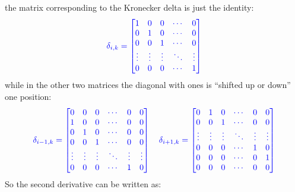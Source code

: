 \documentclass{article}
\begin{document}
\noindent
the matrix corresponding to the Kronecker delta is just the identity:
\begin{equation}
\textcolor{blue}{\delta_{i,k} =
\begin{bmatrix}
1 & 0 & 0 & \cdots & 0 \\
0 & 1 & 0 & \cdots & 0 \\
0 & 0 & 1 & \cdots & 0 \\
\vdots & \vdots & \vdots & \ddots & \vdots \\
0 & 0 & 0 & \cdots & 1
\end{bmatrix}}
\end{equation}
while in the other two matrices the diagonal with ones is ``shifted up or down'' one position:
\begin{equation}
    \textcolor{blue}{
\delta_{i-1,k} =
\begin{bmatrix}
0 & 0 & 0 & \cdots & 0 & 0 \\
1 & 0 & 0 & \cdots & 0 & 0 \\
0 & 1 & 0 & \cdots & 0 & 0 \\
0 & 0 & 1 & \cdots & 0 & 0 \\
\vdots & \vdots & \vdots & \ddots & \vdots & \vdots \\
0 & 0 & 0 & \cdots & 1 & 0
\end{bmatrix}
\quad
\delta_{i+1,k} =
\begin{bmatrix}
0 & 1 & 0 & \cdots & 0 & 0 \\
0 & 0 & 1 & \cdots & 0 & 0 \\
\vdots & \vdots & \vdots & \ddots & \vdots & \vdots \\
0 & 0 & 0 & \cdots & 1 & 0 \\
0 & 0 & 0 & \cdots & 0 & 1 \\
0 & 0 & 0 & \cdots & 0 & 0
\end{bmatrix}
}
\end{equation}
So the second derivative can be written as:
\end{document}
